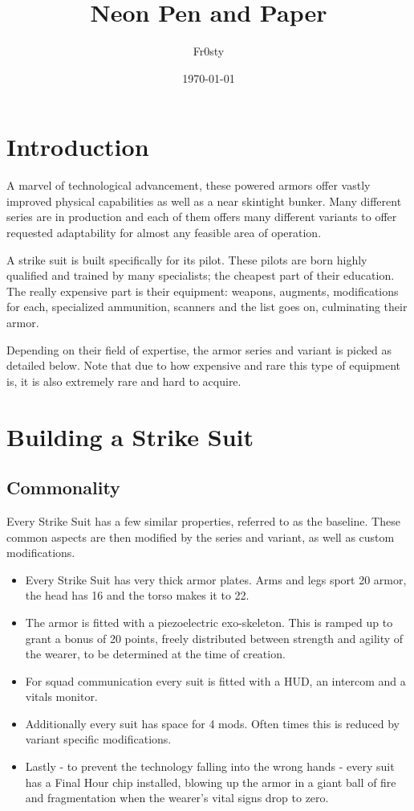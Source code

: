 \documentclass[12pt,a4paper,openany]{book}
\title{Neon Pen and Paper}
\author{Fr0sty}
\date{\today}
\begin{document}
	\maketitle
	\tableofcontents
	
	\chapter{Introduction}
	A marvel of technological advancement, these powered armors offer vastly improved physical capabilities as well as a near skintight bunker. Many different series are in production and each of them offers many different variants to offer requested adaptability for almost any feasible area of operation.\par
	A strike suit is built specifically for its pilot. These pilots are born highly qualified and trained by many specialists; the cheapest part of their education. The really expensive part is their equipment: weapons, augments, modifications for each, specialized ammunition, scanners and the list goes on, culminating their armor.\par
	Depending on their field of expertise, the armor series and variant is picked as detailed below. Note that due to how expensive and rare this type of equipment is, it is also extremely rare and hard to acquire.
	
	\chapter{Building a Strike Suit}
	\section{Commonality}
	Every Strike Suit has a few similar properties, referred to as the baseline. These common aspects are then modified by the series and variant, as well as custom modifications.\par
	\begin{itemize}
		\item Every Strike Suit has very thick armor plates. Arms and legs sport 20 armor, the head has 16 and the torso makes it to 22.
		\item The armor is fitted with a piezoelectric exo-skeleton. This is ramped up to grant a bonus of 20 points, freely distributed between strength and agility of the wearer, to be determined at the time of creation.
		\item For squad communication every suit is fitted with a HUD, an intercom and a vitals monitor.
		\item Additionally every suit has space for 4 mods. Often times this is reduced by variant specific modifications.
		\item Lastly - to prevent the technology falling into the wrong hands - every suit has a Final Hour chip installed, blowing up the armor in a giant ball of fire and fragmentation when the wearer's vital signs drop to zero.
	\end{itemize}
\end{document}
